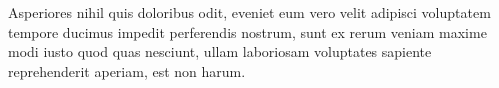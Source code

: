 \documentclass[letterpaper]{article}
\begin{document}
\normalsize

Asperiores nihil quis doloribus odit, eveniet eum vero velit adipisci voluptatem tempore ducimus impedit perferendis nostrum, sunt ex rerum veniam maxime modi iusto quod quas nesciunt, ullam laboriosam voluptates sapiente reprehenderit aperiam, est non harum.\clearpage

\end{document}
